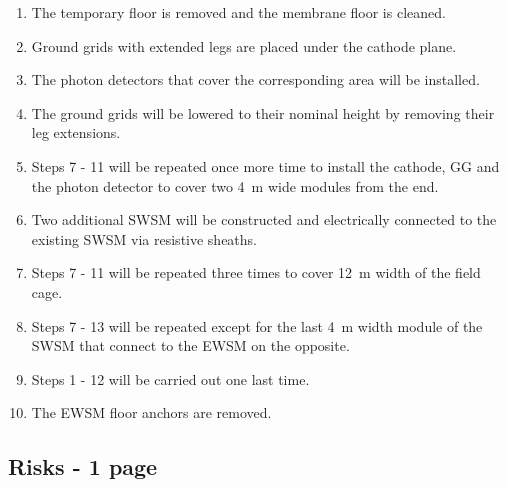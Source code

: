 \begin{enumerate}
    \item The temporary floor is removed and the membrane floor is cleaned.
    \item Ground grids with extended legs are placed under the cathode plane.
    \item The photon detectors that cover the corresponding area will be installed.
    \item The ground grids will be lowered to their nominal height by removing their leg extensions.
    \item Steps 7 - 11 will be repeated once more time to install the cathode, GG and the photon detector to cover two \SI{4}{\m} wide modules from the end.
    \item Two additional SWSM will be constructed and electrically connected to the existing SWSM via resistive sheaths.
    \item Steps 7 - 11 will be repeated three times to cover \SI{12}{\m} width of the field cage.
    \item Steps 7 - 13 will be repeated except for the last \SI{4}{\m} width module of the SWSM that connect to the EWSM on the opposite.
    \item Steps 1 - 12 will be carried out one last time.
    \item The EWSM floor anchors are removed.
\end{enumerate}



\label{sec:fddp-hv-org-consortium}
\subsection{Risks - 1 page}
\label{sec:fddp-hv-org-risk}

